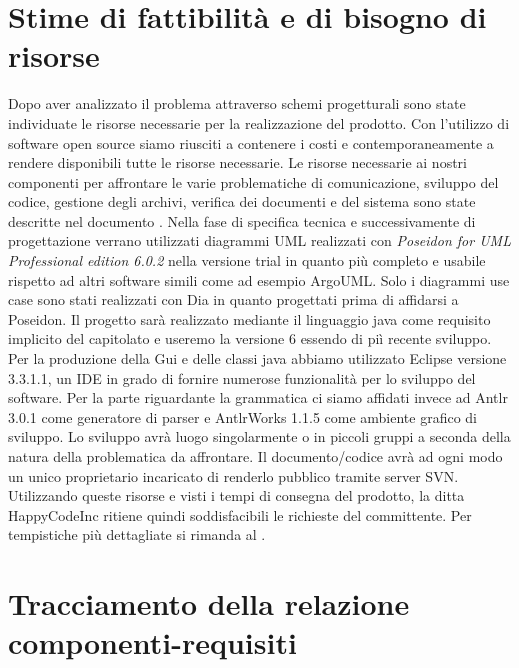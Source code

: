\documentclass[11pt,titlepage,a4paper]{report}
\begin{document}
\chapter{Stime di fattibilit\`a e di bisogno di risorse}
Dopo aver analizzato il problema attraverso schemi progetturali sono state individuate le risorse necessarie per la realizzazione del prodotto. Con l'utilizzo di software open source siamo riusciti a contenere i costi e contemporaneamente a rendere disponibili tutte le risorse necessarie.
Le risorse necessarie ai nostri componenti per affrontare le varie problematiche di comunicazione, sviluppo del codice, gestione degli archivi, verifica dei documenti e del sistema sono state descritte nel documento \PdQ.
Nella fase di specifica tecnica e successivamente di progettazione verrano utilizzati diagrammi UML realizzati con \textit{Poseidon for UML Professional edition 6.0.2} nella versione trial in quanto pi\`u completo e usabile rispetto ad altri software simili come ad esempio ArgoUML. Solo i diagrammi use case sono stati realizzati con Dia in quanto progettati prima di affidarsi a Poseidon.
Il progetto sar\`a realizzato mediante il linguaggio java come requisito implicito del capitolato e useremo la versione 6 essendo di pi\`i recente sviluppo.
Per la produzione della Gui e delle classi java abbiamo utilizzato Eclipse versione 3.3.1.1, un IDE in grado di fornire numerose funzionalit\`a per lo sviluppo del software.
Per la parte riguardante la grammatica ci siamo affidati invece ad Antlr 3.0.1 come generatore di parser e AntlrWorks 1.1.5 come ambiente grafico di sviluppo.
Lo sviluppo avr\`a luogo singolarmente o in piccoli gruppi a seconda della natura della problematica da affrontare.
Il documento/codice avr\`a ad ogni modo un unico proprietario incaricato di renderlo pubblico tramite server SVN.
Utilizzando queste risorse e visti i tempi di consegna del prodotto, la ditta HappyCodeInc ritiene quindi soddisfacibili le richieste del committente.
Per tempistiche pi\`u dettagliate si rimanda al \PdP.

\chapter{Tracciamento della relazione componenti-requisiti}
\end{document}
